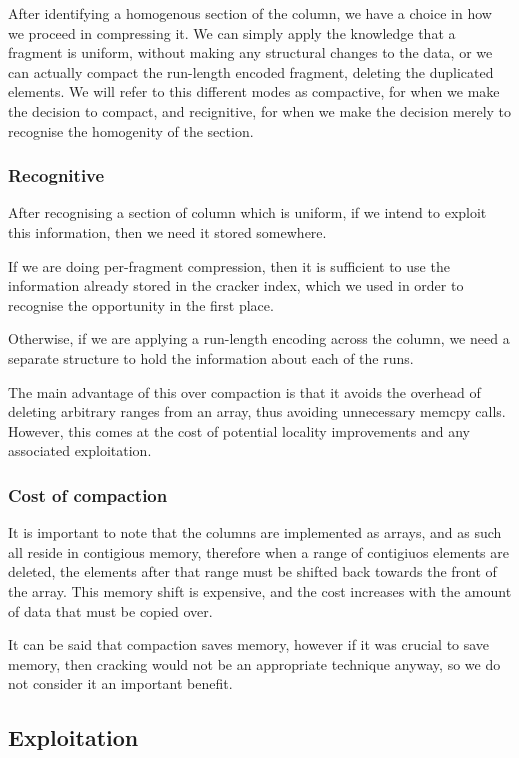 After identifying a homogenous section of the column, we have a choice in how we proceed in
compressing it. We can simply apply the knowledge that a fragment is uniform, without making any
structural changes to the data, or we can actually compact the run-length encoded fragment, deleting
the duplicated elements. We will refer to this different modes as compactive, for when we make the
decision to compact, and recignitive, for when we make the decision merely to recognise the
homogenity of the section.

\subsubsection{Recognitive}

After recognising a section of column which is uniform, if we intend to exploit this information, then
we need it stored somewhere.

If we are doing per-fragment compression, then it is sufficient to use the information already stored
in the cracker index, which we used in order to recognise the opportunity in the first place.

Otherwise, if we are applying a run-length encoding across the column, we need a separate structure to
hold the information about each of the runs.

The main advantage of this over compaction is that it avoids the overhead of deleting arbitrary ranges
from an array, thus avoiding unnecessary memcpy calls. However, this comes at the cost of potential
locality improvements and any associated exploitation.

\subsubsection{Cost of compaction}

It is important to note that the columns are implemented as arrays, and as such all reside in
contigious memory, therefore when a range of contigiuos elements are deleted, the elements after
that range must be shifted back towards the front of the array. This memory shift is expensive,
and the cost increases with the amount of data that must be copied over.

It can be said that compaction saves memory, however if it was crucial to save memory, then cracking
would not be an appropriate technique anyway, so we do not consider it an important benefit.

\subsection{Exploitation}

\label{ss:compressionexploitation}
